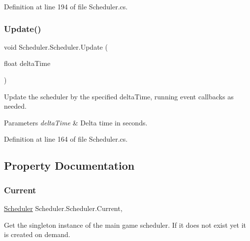Definition at line 194 of file Scheduler.\+cs.

\mbox{\label{class_scheduler_1_1_scheduler_a9762a6e51fd4a109c4a89b718a5a8ce3}} 
\subsubsection{\texorpdfstring{Update()}{Update()}}
{\footnotesize\ttfamily void Scheduler.\+Scheduler.\+Update (\begin{DoxyParamCaption}\item[{float}]{delta\+Time }\end{DoxyParamCaption})}



Update the scheduler by the specified delta\+Time, running event callbacks as needed. 


\begin{DoxyParams}{Parameters}
{\em delta\+Time} & Delta time in seconds.\\
\hline
\end{DoxyParams}


Definition at line 164 of file Scheduler.\+cs.



\subsection{Property Documentation}
\mbox{\label{class_scheduler_1_1_scheduler_a66617179c19d1dd759b5eec0fb538907}} 
\subsubsection{\texorpdfstring{Current}{Current}}
{\footnotesize\ttfamily \hyperlink{class_scheduler_1_1_scheduler}{Scheduler} Scheduler.\+Scheduler.\+Current\hspace{0.3cm}{\ttfamily [static]}, {\ttfamily [get]}}



Get the singleton instance of the main game scheduler. If it does not exist yet it is created on demand. 



